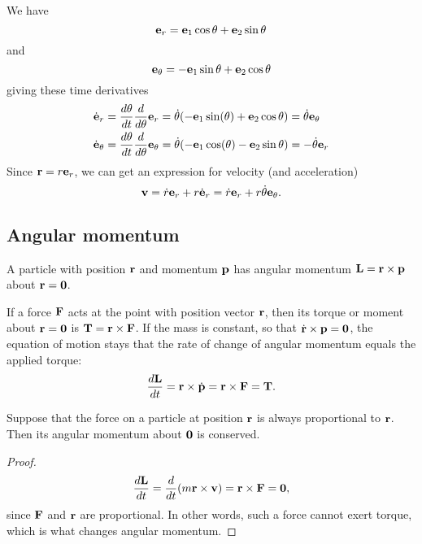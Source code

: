 \documentclass[10pt, a4paper]{article}
\begin{document}
We have
\[
\mathbf{e}_r = \mathbf{e}_1\cos{\theta} + \mathbf{e}_2\sin{\theta}
\]
and
\[
\mathbf{e}_{\theta} = -\mathbf{e}_1\sin{\theta} + \mathbf{e}_2\cos{\theta}
\]
giving these time derivatives
\begin{align*}
    \dot{\mathbf{e}}_r &= \frac{d\theta}{dt}\frac{d}{d\theta}\mathbf{e}_r = \dot{\theta}(-\mathbf{e}_1\sin(\theta) + \mathbf{e}_2\cos{\theta}) = \dot{\theta}\mathbf{e}_{\theta} \\
    \dot{\mathbf{e}}_{\theta} &= \frac{d\theta}{dt}\frac{d}{d\theta}\mathbf{e}_{\theta} = \dot{\theta}(-\mathbf{e}_1\cos(\theta) - \mathbf{e}_2\sin{\theta}) = -\dot{\theta}\mathbf{e}_r
\end{align*}
Since $\mathbf{r} = r\mathbf{e}_r$,
we can get an expression for velocity
(and acceleration)
\[
\mathbf{v} = \dot{r}\mathbf{e}_r + r\dot{\mathbf{e}}_r = \dot{r}\mathbf{e}_r + r\dot{\theta}\mathbf{e}_{\theta}.
\]

\subsection{Angular momentum}
A particle with position $\mathbf{r}$ and momentum $\mathbf{p}$ has angular momentum $\mathbf{L} = \mathbf{r} \times \mathbf{p}$ about $\mathbf{r} = \mathbf{0}$.

If a force $\mathbf{F}$ acts at the point with position vector $\mathbf{r}$,
then its torque or moment about $\mathbf{r} = \mathbf{0}$ is $\mathbf{T} = \mathbf{r} \times \mathbf{F}$.
If the mass is constant,
so that $\dot{\mathbf{r}} \times \mathbf{p} = \mathbf{0}$,
the equation of motion stays that the rate of change of angular momentum equals the applied torque:
\[
\frac{d\mathbf{L}}{dt} = \mathbf{r} \times \dot{\mathbf{p}} = \mathbf{r} \times \mathbf{F} = \mathbf{T}.
\]

\begin{proposition}
    Suppose that the force on a particle at position $\mathbf{r}$ is always proportional to $\mathbf{r}$.
    Then its angular momentum about $\mathbf{0}$ is conserved.

    \begin{proof}
        \[
        \frac{d\mathbf{L}}{dt} = \frac{d}{dt}(m\mathbf{r} \times \mathbf{v}) = \mathbf{r} \times \mathbf{F} = \mathbf{0},
        \]
        since $\mathbf{F}$ and $\mathbf{r}$ are proportional.
        In other words,
        such a force cannot exert torque,
        which is what changes angular momentum.
    \end{proof}
\end{proposition}
\end{document}
